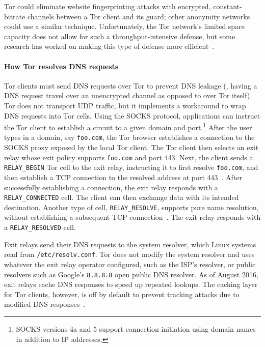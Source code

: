 Tor could eliminate website fingerprinting
attacks with encrypted, constant-bitrate channels between a Tor client and
its guard; other anonymity networks could use a similar technique.
Unfortunately, the Tor network's limited spare capacity does not
allow for such a throughput-intensive defense, but some research has
worked on making this type of defense
more efficient~\cite{Cai2014a,DBLP:journals/corr/JuarezIPDW15,WangThesis,adapativepadding}.

\paragraph{How Tor resolves DNS requests}
Tor clients must send DNS requests over Tor to prevent DNS {leakage}
(\ie, having a
DNS request travel over an unencrypted channel as opposed to over Tor
itself).  Tor does not transport UDP
traffic, but it implements a workaround to wrap DNS requests into Tor cells.
Using the
SOCKS protocol, applications can instruct the Tor client to establish a circuit to a
given domain and port.\footnote{SOCKS versions 4a and 5 support connection
initiation using domain names in addition to IP addresses.}
After the user types in a domain, say {\tt foo.com}, the Tor browser establishes
a connection to the SOCKS proxy exposed by the local Tor client.
The Tor client then
selects an exit relay whose exit policy supports {\tt foo.com} and port 443.
Next, the client sends a \texttt{RELAY\_BEGIN} Tor cell to the exit relay,
instructing it to first resolve {\tt foo.com}, and then establish a TCP
connection to the resolved
address at port 443~\cite[\S~6.2]{tor-spec}.  After successfully establishing a
connection, the exit relay responds with a \texttt{RELAY\_CONNECTED}
cell.  The client can then exchange data with its intended
destination.  Another type of cell, \texttt{RELAY\_RESOLVE}, supports pure name
resolution, without establishing a subsequent TCP
connection~\cite[\S~6.4]{tor-spec}.  The exit relay responds with a
\texttt{RELAY\_RESOLVED} cell.

Exit relays send
their DNS requests to the system resolver, which Linux systems read from
\texttt{/etc/resolv.conf}.  Tor does not modify the system resolver and
uses whatever the exit relay operator configured, such as the ISP's resolver,
or public resolvers such as Google's {\tt 8.8.8.8} open public DNS resolver.
As of August 2016, exit relays cache DNS responses to speed up repeated lookups.
The caching layer for Tor clients, however, is off by default to prevent tracking attacks
due to modified DNS responses~\cite{nolocalcache}.
